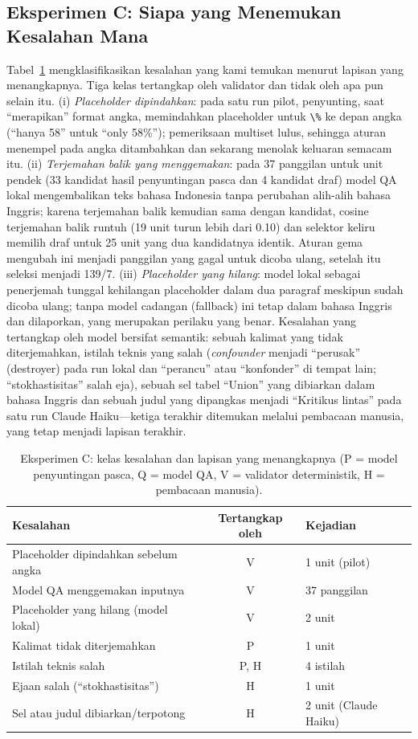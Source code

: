 \subsection{Eksperimen C: Siapa yang Menemukan Kesalahan Mana}
Tabel~\ref{tab:errors} mengklasifikasikan kesalahan yang kami temukan menurut lapisan yang menangkapnya. Tiga kelas tertangkap oleh validator dan tidak oleh apa pun selain itu. (i) \emph{Placeholder dipindahkan}: pada satu run pilot, penyunting, saat ``merapikan'' format angka, memindahkan placeholder untuk \verb|\%| ke depan angka (``hanya 58'' untuk ``only 58\%''); pemeriksaan multiset lulus, sehingga aturan menempel pada angka ditambahkan dan sekarang menolak keluaran semacam itu. (ii) \emph{Terjemahan balik yang menggemakan}: pada 37 panggilan untuk unit pendek (33 kandidat hasil penyuntingan pasca dan 4 kandidat draf) model QA lokal mengembalikan teks bahasa Indonesia tanpa perubahan alih-alih bahasa Inggris; karena terjemahan balik kemudian sama dengan kandidat, cosine terjemahan balik runtuh (19 unit turun lebih dari 0.10) dan selektor keliru memilih draf untuk 25 unit yang dua kandidatnya identik. Aturan gema mengubah ini menjadi panggilan yang gagal untuk dicoba ulang, setelah itu seleksi menjadi 139/7. (iii) \emph{Placeholder yang hilang}: model lokal sebagai penerjemah tunggal kehilangan placeholder dalam dua paragraf meskipun sudah dicoba ulang; tanpa model cadangan (fallback) ini tetap dalam bahasa Inggris dan dilaporkan, yang merupakan perilaku yang benar. Kesalahan yang tertangkap oleh model bersifat semantik: sebuah kalimat yang tidak diterjemahkan, istilah teknis yang salah (\emph{confounder} menjadi ``perusak'' (destroyer) pada run lokal dan ``perancu'' atau ``konfonder'' di tempat lain; ``stokhastisitas'' salah eja), sebuah sel tabel ``Union'' yang dibiarkan dalam bahasa Inggris dan sebuah judul yang dipangkas menjadi ``Kritikus lintas'' pada satu run Claude Haiku---ketiga terakhir ditemukan melalui pembacaan manusia, yang tetap menjadi lapisan terakhir.

\begin{table}[t]
  \caption{Eksperimen C: kelas kesalahan dan lapisan yang menangkapnya (P = model penyuntingan pasca, Q = model QA, V = validator deterministik, H = pembacaan manusia).}
  \label{tab:errors}
  \centering
  \small
  \begin{tabular}{@{}p{4.1cm}cp{2.6cm}@{}}
    \toprule
    Kesalahan & Tertangkap oleh & Kejadian \\
    \midrule
    Placeholder dipindahkan sebelum angka & V & 1 unit (pilot) \\
    Model QA menggemakan inputnya & V & 37 panggilan \\
    Placeholder yang hilang (model lokal) & V & 2 unit \\
    Kalimat tidak diterjemahkan & P & 1 unit \\
    Istilah teknis salah & P, H & 4 istilah \\
    Ejaan salah (``stokhastisitas'') & H & 1 unit \\
    Sel atau judul dibiarkan/terpotong & H & 2 unit (Claude Haiku) \\
    \bottomrule
  \end{tabular}
\end{table}

